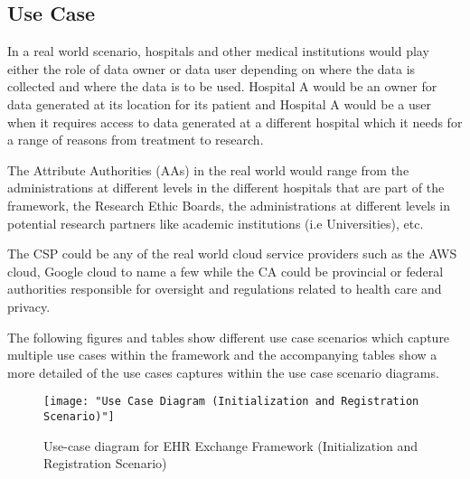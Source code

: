 \subsection{Use Case}

In a real world scenario, hospitals and other medical institutions would play either the role of data owner or data user depending on where the data is collected and where the data is to be used. Hospital A would be an owner for data generated at its location for its patient and Hospital A would be a user when it requires access to data generated at a different hospital which it needs for a range of reasons from treatment to research.

The Attribute Authorities (AAs) in the real world would range from the administrations at different levels in the different hospitals that are part of the framework, the Research Ethic Boards, the administrations at different levels in potential research partners like academic institutions (i.e Universities), etc.

The CSP could be any of the real world cloud service providers such as the AWS cloud, Google cloud to name a few while the CA could be provincial or federal authorities responsible for oversight and regulations related to health care and privacy.

The following figures and tables show different use case scenarios which capture multiple use cases within the framework and the accompanying tables show a more detailed of the use cases captures within the use case scenario diagrams.





\begin{figure}[]
	\centering
	\texttt{[image: "Use Case Diagram (Initialization and Registration Scenario)"]}
	\caption{Use-case diagram for EHR Exchange Framework (Initialization and Registration Scenario)}
	\label{fig:use_case_ini}
\end{figure}


